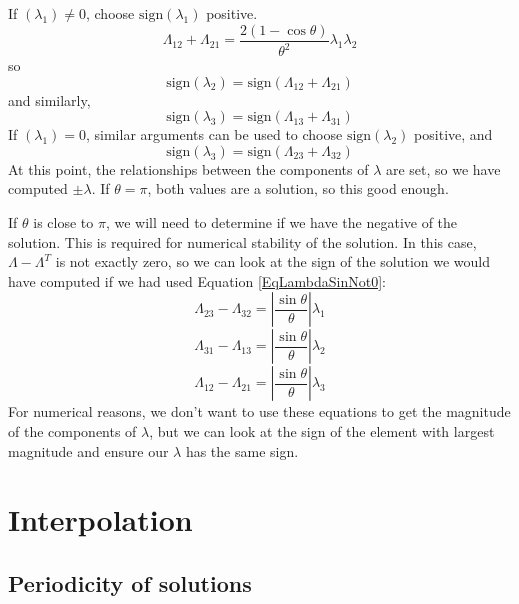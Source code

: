 \documentclass[10pt,letterpaper,oneside,notitlepage]{article}
\begin{document}
If $(\lambda_1) \neq 0$, choose $\mathrm{sign}(\lambda_1)$ positive. 
\begin{equation}
\Lambda_{12}+\Lambda_{21} = \frac{2\left(1-\cos\theta\right)}{\theta^2}\lambda_1\lambda_2   
\end{equation}
so 
\begin{equation}
\mathrm{sign}(\lambda_2) = \mathrm{sign}(\Lambda_{12}+\Lambda_{21}) 
\end{equation}
and similarly,
\begin{equation}
\mathrm{sign}(\lambda_3) = \mathrm{sign}(\Lambda_{13}+\Lambda_{31}) 
\end{equation}
If $(\lambda_1) = 0$, similar arguments can be used to choose $\mathrm{sign}(\lambda_2)$ positive, and 
\begin{equation}
\mathrm{sign}(\lambda_3) = \mathrm{sign}(\Lambda_{23}+\Lambda_{32}) 
\end{equation}
At this point, the relationships between the components of $\lambda$ are set, so we have computed $\pm\lambda$. If $\theta=\pi$, both values are a solution, so this good enough.

If $\theta$ is close to $\pi$, we will need to determine if we have the negative of the solution. This is required for numerical stability of the solution.
In this case, $\Lambda-\Lambda^T$ is not exactly zero, so we can look at the sign of the solution we would have computed if we had used Equation \ref{EqLambdaSinNot0}:
\begin{equation}
\Lambda_{23}-\Lambda_{32} = \left|\frac{\sin\theta}{\theta}\right|\lambda_1
\end{equation}
\begin{equation}
\Lambda_{31}-\Lambda_{13} = \left|\frac{\sin\theta}{\theta}\right|\lambda_2
\end{equation}
\begin{equation}
\Lambda_{12}-\Lambda_{21} = \left|\frac{\sin\theta}{\theta}\right|\lambda_3
\end{equation}
For numerical reasons, we don't want to use these equations to get the magnitude of the components of $\lambda$, but we can look at the sign of the element with largest magnitude and ensure our $\lambda$ has the same sign.

\section{Interpolation}
\subsection{Periodicity of solutions} 
\end{document}
